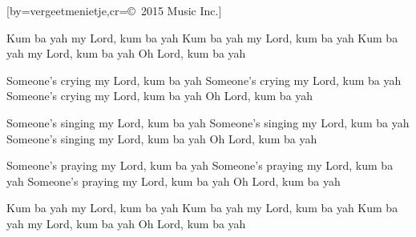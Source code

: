  

[by=vergeetmenietje,cr={\copyright~2015 Music Inc.}]




\beginverse
    Kum ba yah my Lord, kum ba yah
    Kum ba yah my Lord, kum ba yah
    Kum ba yah my Lord, kum ba yah
    Oh Lord, kum ba yah
\endverse

\beginverse
    Someone's crying my Lord, kum ba yah
    Someone's crying my Lord, kum ba yah
    Someone's crying my Lord, kum ba yah
    Oh Lord, kum ba yah
\endverse

\beginverse

    Someone's singing my Lord, kum ba yah
    Someone's singing my Lord, kum ba yah
    Someone's singing my Lord, kum ba yah
    Oh Lord, kum ba yah
\endverse

\beginverse

    Someone's praying my Lord, kum ba yah
    Someone's praying my Lord, kum ba yah
    Someone's praying my Lord, kum ba yah
    Oh Lord, kum ba yah
\endverse

\beginverse

    Kum ba yah my Lord, kum ba yah
    Kum ba yah my Lord, kum ba yah
    Kum ba yah my Lord, kum ba yah
    Oh Lord, kum ba yah
\endverse




\endsong
